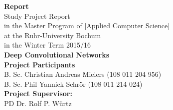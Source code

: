 \documentclass[11pt, a4paper]{article}
\begin{document}
\thispagestyle{empty}

\setlength{\hoffset}{-0.5cm} %

\lstset{
  basicstyle=\small,           %
  breaklines=true,             %
  captionpos=b,                %
  frame=single,                %
  keepspaces=true,             %
  numbers=right,               %
  showspaces=false,            %
  stepnumber=1,                %
  tabsize=4,                   %
  xleftmargin=0.14cm		   %
}


\begin{titlepage}
    \begin{center}
    \vphantom{0cm}
    \LARGE \textbf{Report}\\
    \vspace{3cm}
    \normalsize
    Study Project Report \\
    in the Master Program of \textcolor{AI-BLUE}{[Applied Computer Science]}\\
    at the Ruhr-University Bochum\\
    in the Winter Term 2015/16\\
    \vspace{4cm}
    \huge \textbf{Deep Convolutional Networks} \\
    \vspace{4cm}
    \normalsize
    \textbf{Project Participants}\\
    B. Sc. Christian Andreas Mielers (108 011 204 956)\\
    B. Sc. Phil Yannick Schrör (108 011 214 024)\\
    \vspace{2cm}
    \textbf{Project Supervisor:}\\
    PD Dr. Rolf P. Würtz
    \end{center}
\end{titlepage}

\newpage
{}
\setcounter{page}{2}

\tableofcontents
\end{document}
